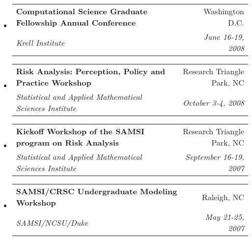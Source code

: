 \documentclass[letterpaper,11pt]{article}
\makeatletter
\newcommand{\ressubheading}[4]{
\begin{tabular*}{6.5in}{l@{\cftdotfill{\cftsecdotsep}\extracolsep{\fill}}r}
		\textbf{#1} & #2 \\
		\textit{#3} & \textit{#4} \\
\end{tabular*}\vspace{-6pt}}
\makeatother
\begin{document}
\begin{itemize}
\item
	\ressubheading{Computational Science Graduate Fellowship Annual Conference}{Washington D.C.}{Krell Institute}{June 16-19, 2008}
\item
	\ressubheading{Risk Analysis: Perception, Policy and Practice Workshop}{Research Triangle Park, NC}{Statistical and Applied Mathematical Sciences Institute}{October 3-4, 2008}
\item
	\ressubheading{Kickoff Workshop of the SAMSI program on Risk Analysis}{Research Triangle Park, NC}{Statistical and Applied Mathematical Sciences Institute}{September 16-19, 2007}
\item
	\ressubheading{SAMSI/CRSC Undergraduate Modeling Workshop}{Raleigh, NC}{SAMSI/NCSU/Duke}{May 21-25, 2007}
\end{itemize}

\pagebreak
\end{document}
